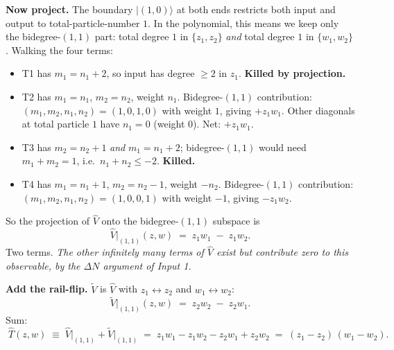 \documentclass[11pt,a4paper]{article}
\begin{document}
\textbf{Now project.} The boundary $|(1,0)\rangle$ at both ends restricts both input and output to total-particle-number $1$. In the polynomial, this means we keep only the bidegree-$(1,1)$ part: total degree $1$ in $\{z_1,z_2\}$ \emph{and} total degree $1$ in $\{w_1,w_2\}$. Walking the four terms:
\begin{itemize}[leftmargin=2em,itemsep=0pt]
  \item T1 has $m_1{=}n_1{+}2$, so input has degree $\ge 2$ in $z_1$. \textbf{Killed by projection.}
  \item T2 has $m_1{=}n_1$, $m_2{=}n_2$, weight $n_1$. Bidegree-$(1,1)$ contribution: $(m_1,m_2,n_1,n_2)=(1,0,1,0)$ with weight $1$, giving $+z_1 w_1$. Other diagonals at total particle $1$ have $n_1=0$ (weight 0). Net: $+z_1 w_1$.
  \item T3 has $m_2{=}n_2{+}1$ \emph{and} $m_1{=}n_1{+}2$; bidegree-$(1,1)$ would need $m_1{+}m_2=1$, i.e.\ $n_1+n_2 \le -2$. \textbf{Killed.}
  \item T4 has $m_1{=}n_1{+}1$, $m_2{=}n_2{-}1$, weight $-n_2$. Bidegree-$(1,1)$ contribution: $(m_1,m_2,n_1,n_2)=(1,0,0,1)$ with weight $-1$, giving $-z_1 w_2$.
\end{itemize}
So the projection of $\widehat V$ onto the bidegree-$(1,1)$ subspace is
\[
\widehat V\big|_{(1,1)}(z,w) \;=\; z_1 w_1 \;-\; z_1 w_2.
\]
Two terms. \emph{The other infinitely many terms of $\widehat V$ exist but contribute zero to this observable, by the $\Delta N$ argument of Input 1.}

\textbf{Add the rail-flip.} $\widetilde V$ is $\widehat V$ with $z_1{\leftrightarrow}z_2$ and $w_1{\leftrightarrow}w_2$:
\[
\widetilde V\big|_{(1,1)}(z,w) \;=\; z_2 w_2 \;-\; z_2 w_1.
\]
Sum:
\[
\boxed{\;
\widehat T(z,w) \;\equiv\; \widehat V\big|_{(1,1)} + \widetilde V\big|_{(1,1)}
\;=\; z_1 w_1 - z_1 w_2 - z_2 w_1 + z_2 w_2
\;=\; (z_1 - z_2)\,(w_1 - w_2).
\;}
\]
\end{document}
